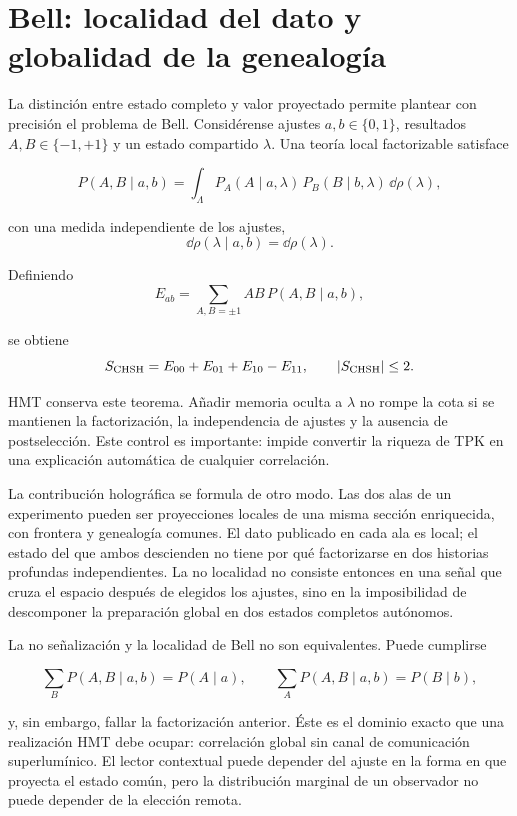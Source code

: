 \section{Bell: localidad del dato y globalidad de la genealogía}

La distinción entre estado completo y valor proyectado permite plantear con
precisión el problema de Bell. Considérense ajustes \(a,b\in\{0,1\}\), resultados
\(A,B\in\{-1,+1\}\) y un estado compartido \(\lambda\). Una teoría local
factorizable satisface

\[
  P(A,B\mid a,b)
  =
  \int_\Lambda
  P_A(A\mid a,\lambda)\,
  P_B(B\mid b,\lambda)\,
  \dd\rho(\lambda),
\]

con una medida independiente de los ajustes,
\[
  \dd\rho(\lambda\mid a,b)=\dd\rho(\lambda).
\]

Definiendo
\[
  E_{ab}
  =
  \sum_{A,B=\pm1}AB\,P(A,B\mid a,b),
\]

se obtiene
\[
  S_{\rm CHSH}=E_{00}+E_{01}+E_{10}-E_{11},
  \qquad |S_{\rm CHSH}|\leq2.
\]

HMT conserva este teorema. Añadir memoria oculta a \(\lambda\) no rompe la cota si
se mantienen la factorización, la independencia de ajustes y la ausencia de
postselección. Este control es importante: impide convertir la riqueza de TPK en
una explicación automática de cualquier correlación.

La contribución holográfica se formula de otro modo. Las dos alas de un experimento
pueden ser proyecciones locales de una misma sección enriquecida, con frontera y
genealogía comunes. El dato publicado en cada ala es local; el estado del que ambos
descienden no tiene por qué factorizarse en dos historias profundas independientes.
La no localidad no consiste entonces en una señal que cruza el espacio después de
elegidos los ajustes, sino en la imposibilidad de descomponer la preparación global
en dos estados completos autónomos.

La no señalización y la localidad de Bell no son equivalentes. Puede cumplirse

\[
  \sum_B P(A,B\mid a,b)=P(A\mid a),
  \qquad
  \sum_A P(A,B\mid a,b)=P(B\mid b),
\]

y, sin embargo, fallar la factorización anterior. Éste es el dominio exacto que una
realización HMT debe ocupar: correlación global sin canal de comunicación
superlumínico. El lector contextual puede depender del ajuste en la forma en que
proyecta el estado común, pero la distribución marginal de un observador no puede
depender de la elección remota.

